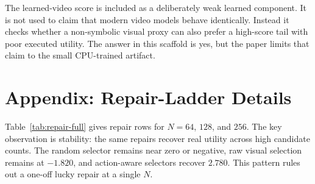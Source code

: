 \documentclass{article}
\begin{document}
The learned-video score is included as a deliberately weak learned component. It is not used to claim that modern video models behave identically. Instead it checks whether a non-symbolic visual proxy can also prefer a high-score tail with poor executed utility. The answer in this scaffold is yes, but the paper limits that claim to the small CPU-trained artifact.

\section{Appendix: Repair-Ladder Details}
\label{app:repair-details}

Table~\ref{tab:repair-full} gives repair rows for \(N=64\), \(128\), and \(256\). The key observation is stability: the same repairs recover real utility across high candidate counts. The random selector remains near zero or negative, raw visual selection remains at \(-1.820\), and action-aware selectors recover \(2.780\). This pattern rules out a one-off lucky repair at a single \(N\).
\end{document}
